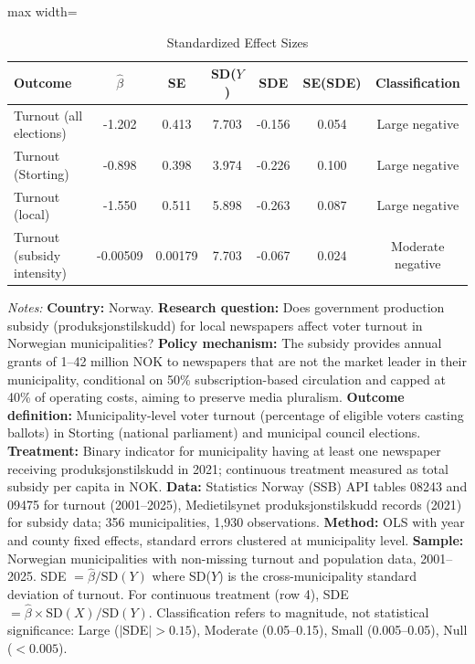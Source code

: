 \begin{table}[htbp]
\centering
\caption{Standardized Effect Sizes}
\label{tab:sde}
\begin{adjustbox}{max width=\textwidth}
\begin{tabular}{lcccccc}
\hline\hline
Outcome & $\hat{\beta}$ & SE & SD($Y$) & SDE & SE(SDE) & Classification \\
\hline
Turnout (all elections) & -1.202 & 0.413 & 7.703 & -0.156 & 0.054 & Large negative \\
Turnout (Storting) & -0.898 & 0.398 & 3.974 & -0.226 & 0.100 & Large negative \\
Turnout (local) & -1.550 & 0.511 & 5.898 & -0.263 & 0.087 & Large negative \\
Turnout (subsidy intensity) & -0.00509 & 0.00179 & 7.703 & -0.067 & 0.024 & Moderate negative \\
\hline\hline
\end{tabular}
\end{adjustbox}
\begin{tablenotes}
\item \textit{Notes:} \textbf{Country:} Norway. \textbf{Research question:} Does government production subsidy (produksjonstilskudd) for local newspapers affect voter turnout in Norwegian municipalities? \textbf{Policy mechanism:} The subsidy provides annual grants of 1--42 million NOK to newspapers that are not the market leader in their municipality, conditional on 50\% subscription-based circulation and capped at 40\% of operating costs, aiming to preserve media pluralism. \textbf{Outcome definition:} Municipality-level voter turnout (percentage of eligible voters casting ballots) in Storting (national parliament) and municipal council elections. \textbf{Treatment:} Binary indicator for municipality having at least one newspaper receiving produksjonstilskudd in 2021; continuous treatment measured as total subsidy per capita in NOK. \textbf{Data:} Statistics Norway (SSB) API tables 08243 and 09475 for turnout (2001--2025), Medietilsynet produksjonstilskudd records (2021) for subsidy data; 356 municipalities, 1,930 observations. \textbf{Method:} OLS with year and county fixed effects, standard errors clustered at municipality level. \textbf{Sample:} Norwegian municipalities with non-missing turnout and population data, 2001--2025. SDE $= \hat{\beta} / \text{SD}(Y)$ where SD($Y$) is the cross-municipality standard deviation of turnout. For continuous treatment (row 4), SDE $= \hat{\beta} \times \text{SD}(X) / \text{SD}(Y)$. Classification refers to magnitude, not statistical significance: Large ($|$SDE$| > 0.15$), Moderate (0.05--0.15), Small (0.005--0.05), Null ($< 0.005$).
\end{tablenotes}
\end{table}

